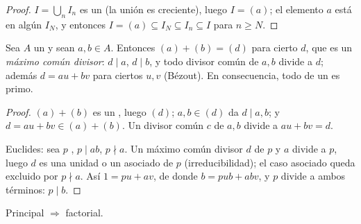 \begin{proof}
$I = \bigcup_n I_n$ es un  (la unión
es creciente), luego $I =
(a)$; el elemento $a$ está en algún $I_N$, y entonces $I = (a)
\subseteq I_N \subseteq I_n \subseteq I$ para $n \geq N$.
\end{proof}

\begin{lemma}\label{lem:b3:rings:bezout}
Sea $A$ un  y sean $a, b \in A$.
Entonces $(a) + (b) = (d)$ para cierto $d$, que es un \emph{máximo común
divisor}: $d \mid a$, $d \mid b$, y todo
divisor común de $a,
b$ divide a $d$; además $d = au + bv$ para ciertos $u, v$ (Bézout). En
consecuencia, todo  de un  es primo.
\end{lemma}

\begin{proof}
$(a) + (b)$ es un , luego $(d)$;
$a, b \in (d)$ da $d \mid
a, b$; y $d = au + bv \in (a) + (b)$. Un divisor común $c$ de $a, b$
divide a $au + bv = d$.

Euclides: sea $p$ ,
$p \mid ab$, $p \nmid a$. Un máximo común divisor $d$ de $p$ y $a$
divide a $p$, luego $d$ es una unidad o un asociado de $p$
(irreducibilidad); el caso asociado queda excluido por $p \nmid a$. Así
$1 = pu + av$, de donde $b = pub + abv$, y $p$ divide a ambos términos:
$p \mid b$.
\end{proof}

\begin{theorem}\label{thm:b3:rings:pidufd}
Principal $\Rightarrow$ factorial.
\end{theorem}

